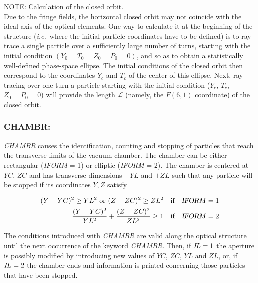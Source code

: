 \noindent NOTE: Calculation of the closed orbit. \\
Due to the fringe fields, the horizontal closed orbit may not 
coincide with the ideal axis of the optical elements. One way to 
calculate it at the beginning of the structure (\emph{i.e.}\ where the 
initial particle coordinates have to be defined) is to ray-trace 
a single particle over a sufficiently large number of turns, 
starting with the initial condition $ (Y_0=T_0=Z_0=P_0=0)$,  and so as to 
obtain a statistically well-defined phase-space ellipse. The 
initial conditions of the closed orbit then correspond to the 
coordinates $ Y_c $ and $ T_c $ of the center of this ellipse. Next, 
ray-tracing over one turn a particle starting with the initial condition 
($Y_c $, $ T_c $, $ Z_0=P_0=0$)  will provide the length $\mathcal{L}$ 
(namely, the $ F(6,1) $ coordinate) of the closed orbit. 

\newpage

\subsubsection*{CHAMBR:  \CHAMBRTitl}\label{CHAMBR} 
\medskip

\textsl{CHAMBR} causes the identification, counting and stopping of 
particles that reach the 
transverse limits of the vacuum chamber.  The chamber can be either rectangular 
(\textsl{IFORM} = 1) or elliptic (\textsl{IFORM} = 2). The chamber is centered
at $ YC$, $ZC $ and has transverse dimensions $\pm YL $ and  
$\pm  ZL $ such that any particle will be stopped if its coordinates $ Y,Z $ satisfy 

\begin{align*}
	(Y-YC)^2\geq  YL^2  \text{ or }   (Z-ZC)^2 \geq  ZL^2 
	   &   \quad \text{if}\quad  \text{\textsl{IFORM}}=1  \\
	\dfrac{ (Y-YC)^2 }{ YL^2} + \dfrac{(Z-ZC)^2 }{ ZL^2} \geq 1  
	  &   \quad \text{if}\quad  \text{\textsl{IFORM}}=2  
\end{align*}

\noindent The conditions introduced with \textsl{CHAMBR} are valid
along  the optical structure until the next occurrence  of the keyword \textsl{CHAMBR}.  Then, if
$ I\!L=1 $ the aperture is possibly modified by introducing new values of $ YC$,  $ ZC$, 
 $YL $ and $ ZL $, or, if $ I\!L=2 $ the chamber ends and information is 
printed concerning those particles that have been stopped.  
\bigskip

